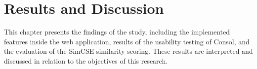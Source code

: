 \chapter{Results and Discussion}
\label{chap:results_and_discussion}




This chapter presents the findings of the study, including the implemented features inside the web application, results of the usability testing of Consol, and the evaluation of the SimCSE similarity scoring. These results are interpreted and discussed in relation to the objectives of this research.





